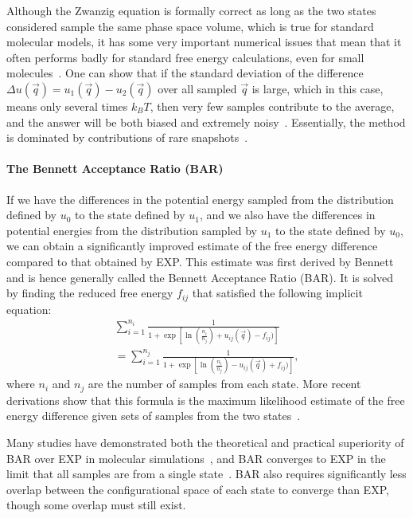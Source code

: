 \documentclass[9pt,bestpractices]{livecoms}
\begin{document}
Although the Zwanzig equation is formally correct as long as the two states considered sample the same phase space volume, which is true for standard molecular models, it has some very important numerical issues that mean that it often performs badly for standard free energy calculations, even for small molecules~\cite{shirts2005comparison,lu2003appropriate}. One can show that if the standard deviation of the difference $\Delta u(\vec{q}) = u_1(\vec{q})-u_2(\vec{q})$ over all sampled $\vec{q}$ is large, which in this case, means only several times $k_BT$, then very few samples contribute to the average, and the answer will be both biased and extremely noisy~\cite{lelievre2010free}. Essentially, the method is dominated by contributions of rare snapshots~\cite{jarzynski2006rare, wu2005phasespace, wu2005phasespacea}. 


\paragraph{The Bennett Acceptance Ratio (BAR)}
If we have the differences in the potential energy sampled from the distribution defined by $u_0$ to the state defined by $u_1$, and we also have the differences in potential energies from the distribution sampled by $u_1$ to the state defined by $u_0$, we can obtain a significantly improved estimate of the
free energy difference compared to that obtained by EXP. 
This estimate was first derived by Bennett and is hence generally called the Bennett Acceptance Ratio (BAR). It is solved by finding the reduced free energy $f_{ij}$ that satisfied the following implicit equation:
\begin{eqnarray}
 \sum_{i=1}^{n_i} \frac{1}{1 + \exp[\ln(\frac{n_i}{n_j}) + u_{ij}(\vec{q}) - f_{ij})
 ]} \nonumber \\
 =\sum_{i=1}^{n_j} \frac{1}{1 + \exp[\ln(\frac{n_i}{n_j}) - u_{ij}(\vec{q}) + f_{ij})]},
\end{eqnarray}
where $n_i$ and $n_j$ are the number of samples from each state. More recent derivations show that this formula is the maximum likelihood estimate of the free energy difference given sets of samples from the two states~\cite{shirts2003equilibrium}. 

Many studies have demonstrated both the theoretical and practical superiority of BAR over EXP in molecular
simulations~\cite{shirts2005comparison,lu2003appropriate}, and BAR converges to EXP in the limit that all samples are from a single state~\cite{bennett1976efficient,bennett1976efficient,shirts2003equilibrium}. BAR also requires significantly less overlap between the configurational space of each state to converge than EXP, though some overlap must still exist.
\end{document}
